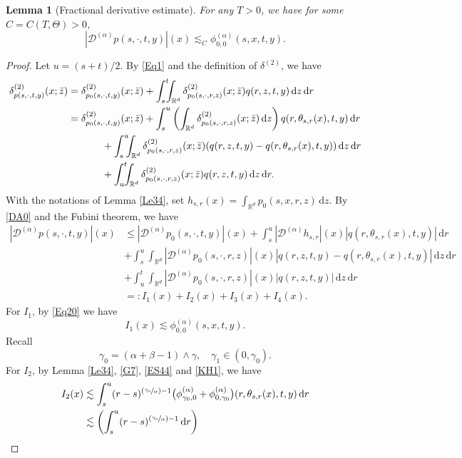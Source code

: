 \documentclass[11pt]{article}
\numberwithin{equation}{section}\providecommand{\asymp}{\mathrel{\sim}}
\newcommand{\Psfrac}[2]{(\sfrac{#1}{#2})}
\theoremstyle{plain}
\newtheorem{lemma}[theorem]{Lemma}
\theoremstyle{definition}
\newcommand\cD{{\mathcal D}}
\newcommand\mR{\mathbb{R}}
\newcommand\1{{\mathbf{1}}}
\newcommand{\dif}{\,\mathrm{d}}
\begin{document}
\begin{lemma}[Fractional derivative estimate]\label{Le35}
For any $T>0$, we have for some $C=C(T,\Theta)>0$,
\[
|\cD^{(\alpha)}p(s,\cdot,t,y)|(x)\lesssim_C \phi^{(\alpha)}_{0,0}(s,x,t,y).
\]
\end{lemma}

\begin{proof}
Let $u=(s+t)/2$. By \eqref{Eq1} and the definition of $\delta^{(2)}$, we have
\begin{align*}
\delta^{(2)}_{p(s,\cdot,t,y)}(x;\bar z)&=
\delta^{(2)}_{p_0(s,\cdot,t,y)}(x;\bar z)+\int^t_{s}\!\!\!\int_{\mR^d}\delta^{(2)}_{p_0(s,\cdot,r,z)}(x;\bar z)q(r,z,t,y)\dif z\dif r\\
&=\delta^{(2)}_{p_0(s,\cdot,t,y)}(x;\bar z)+\int^u_{s}\left(\int_{\mR^d}\delta^{(2)}_{p_0(s,\cdot,r,z)}(x;\bar z)\dif z\right)q(r,\theta_{s,r}(x),t,y)\dif r\\
&\hspace*{1.2cm}+\int^u_{s}\!\!\!\int_{\mR^d}\delta^{(2)}_{p_0(s,\cdot,r,z)}(x;\bar z)(q(r,z,t,y)-q(r,\theta_{s,r}(x),t,y))\dif z\dif r\\
&\hspace*{1.2cm}+\int^t_u\!\!\!\int_{\mR^d}\delta^{(2)}_{p_0(s,\cdot,r,z)}(x;\bar z)q(r,z,t,y)\dif z\dif r.
\end{align*}
With the notations of Lemma \ref{Le34}, set
$h_{s,r}(x)=\int_{\mR^d}p_0(s,x,r,z)\dif z$. By \eqref{DA0} and the Fubini theorem, we have
\begin{align*}
|\cD^{(\alpha)} p(s,\cdot,t,y)|(x)
&\leq|\cD^{(\alpha)} p_0(s,\cdot,t,y)|(x)+\int^u_s |\cD^{(\alpha)}h_{s,r}|(x)|q(r,\theta_{s,r}(x),t,y)|\dif r
\\&+\int^u_s\!\!\!\int_{\mR^d}|\cD^{(\alpha) }p_0(s,\cdot,r,z)|(x)|q(r,z,t,y)-q(r,\theta_{s,r}(x),t,y)|\dif z\dif r
\\&+\int^t_u\!\!\!\int_{\mR^d}|\cD^{(\alpha) }p_0(s,\cdot,r,z)|(x)|q(r,z,t,y)|\dif z\dif r\\
&=:I_1(x)+I_2(x)+I_3(x)+I_4(x).
\end{align*}
For $I_1$, by \eqref{Eq20} we have
\[
I_1(x)\lesssim \phi^{(\alpha)}_{0,0}(s,x,t,y).
\]
Recall
\[
\gamma_0{=}(\alpha+\beta-1)\wedge\gamma,\quad \gamma_1\in(0,\gamma_0).
\]
For $I_2$, by Lemma \ref{Le34}, \eqref{G7}, \eqref{ES44} and \eqref{KH1}, we have
\begin{align*}
I_2(x)&\lesssim\int^u_s(r-s)^{\Psfrac{\gamma_0}{\alpha}-1}\bigl(\phi^{(\alpha)}_{\gamma_0,0}
+\phi^{(\alpha)}_{0,\gamma_0}\bigr)(r,\theta_{s,r}(x),t,y)\dif r
\\&\lesssim\biggl(\int^u_s(r-s)^{\Psfrac{\gamma_0}{\alpha}-1}\dif r\biggr)

\end{align*}
\end{proof}
\end{document}

